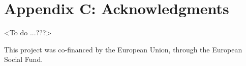 
\chapter*{{\Large{\vspace{-2.3cm}Appendix C: Acknowledgments}}}

\noindent {}
\fancyhead[LO]{}

\noindent %

<To do ...???>

\noindent 

This project was co-financed by the European Union, through the European
Social Fund.
